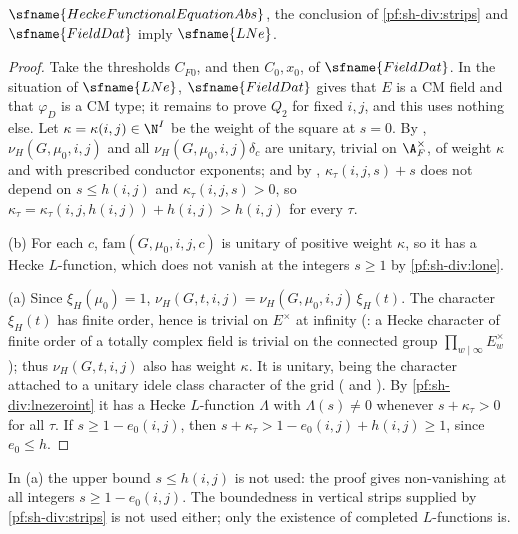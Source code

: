 \begin{proposition}\label{pf:sh-div:lne}
$\sfname{HeckeFunctionalEquationAbs}$, the conclusion of \cref{pf:sh-div:strips} and $\sfname{FieldDat}$ imply $\sfname{LNe}$.
\end{proposition}

\begin{proof}
Take the thresholds $C_{F0}$, and then $C_0,x_0$, of $\sfname{FieldDat}$. In the situation of $\sfname{LNe}$, $\sfname{FieldDat}$ gives
that $E$ is a CM field and that $\varphi_D$ is a CM type; it remains to prove $Q_2$ for fixed $i,j$, and this uses nothing else. Let $\kappa=\kappa(i,j)\in\N^I$ be the weight of the square at $s=0$. By
, $\nu_H(G,\mu_0,i,j)$ and all $\nu_H(G,\mu_0,i,j)\delta_c$ are unitary, trivial on
$\A_F^\times$, of weight $\kappa$ and with prescribed conductor exponents; and by
, $\kappa_\tau(i,j,s)+s$ does not depend on $s\le h(i,j)$ and $\kappa_\tau(i,j,s)>0$,
so $\kappa_\tau=\kappa_\tau(i,j,h(i,j))+h(i,j)>h(i,j)$ for every $\tau$.

(b) For each $c$, $\mathrm{fam}(G,\mu_0,i,j,c)$ is unitary of positive weight $\kappa$, so it has a Hecke $L$-function, which does not
vanish at the integers $s\ge1$ by \cref{pf:sh-div:lone}.

(a) Since $\xi_H(\mu_0)=1$, $\nu_H(G,t,i,j)=\nu_H(G,\mu_0,i,j)\,\xi_H(t)$. The character $\xi_H(t)$ has finite order, hence is trivial
on $E^\times$ at infinity (: a Hecke character of finite order of a totally complex field
is trivial on the connected group $\prod_{w\mid\infty}E_w^\times$); thus $\nu_H(G,t,i,j)$ also has weight $\kappa$. It is unitary, being
the character attached to a unitary idele class character of the grid
( and ). By
\cref{pf:sh-div:lnezeroint} it has a Hecke $L$-function $\Lambda$ with $\Lambda(s)\ne0$ whenever $s+\kappa_\tau>0$ for all $\tau$. If
$s\ge1-e_0(i,j)$, then $s+\kappa_\tau>1-e_0(i,j)+h(i,j)\ge1$, since $e_0\le h$.
\end{proof}

\begin{remark}\label{pf:sh-div:rem:lne}
In (a) the upper bound $s\le h(i,j)$ is not used: the proof gives non-vanishing at all integers $s\ge1-e_0(i,j)$. The boundedness
in vertical strips supplied by \cref{pf:sh-div:strips} is not used either; only the existence of completed $L$-functions is.
\end{remark}

